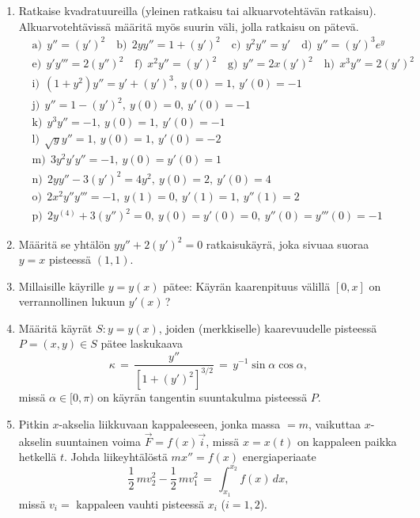 \Harj
\begin{enumerate}

\item
Ratkaise kvadratuureilla (yleinen ratkaisu tai alkuarvotehtävän ratkaisu). Alkuarvotehtävissä
määritä myös suurin väli, jolla ratkaisu on pätevä.
\begin{align*}
&\text{a)}\ \ y''=(y')^2 \quad
 \text{b)}\ \ 2yy''=1+(y')^2 \quad
 \text{c)}\ \ y^2y''=y' \quad
 \text{d)}\ \ y''=(y')^3e^y \\
&\text{e)}\ \ y'y'''=2(y'')^2 \quad
 \text{f)}\ \ x^2y''=(y')^2 \quad
 \text{g)}\ \ y''=2x(y')^2 \quad
 \text{h)}\ \ x^3y''=2(y')^2 \\
&\text{i)}\ \ (1+y^2)y''=y'+(y')^3,\ y(0)=1,\ y'(0)=-1 \\
&\text{j)}\ \ y''=1-(y')^2,\ y(0)=0,\ y'(0)=-1 \\
&\text{k)}\ \ y^3y''=-1,\ y(0)=1,\ y'(0)=-1 \\
&\text{l)}\ \ \sqrt{y}y''=1,\ y(0)=1,\ y'(0)=-2 \\
&\text{m)}\ \ 3y^2y'y''=-1,\ y(0)=y'(0)=1 \\
&\text{n)}\ \ 2yy''-3(y')^2=4y^2,\ y(0)=2,\ y'(0)=4 \\
&\text{o)}\ \ 2x^2y''y'''=-1,\ y(1)=0,\ y'(1)=1,\ y''(1)=2 \\
&\text{p)}\ \ 2y^{(4)}+3(y'')^2=0,\ y(0)=y'(0)=0,\ y''(0)=y'''(0)=-1
\end{align*}

\item
Määritä se yhtälön $yy''+2(y')^2=0$ ratkaisukäyrä, joka sivuaa suoraa $y=x$ pisteessä $(1,1)$.

\item
Millaisille käyrille $y=y(x)$ pätee: Käyrän kaarenpituus välillä $[0,x]$ on verrannollinen
lukuun $y'(x)\,$?

\item
Määritä käyrät $S: y=y(x)$, joiden (merkkiselle) kaarevuudelle pisteessä $P=(x,y) \in S$ pätee
laskukaava
\[
\kappa \,=\, \frac{y''}{[1+(y')^2]^{3/2}} \,=\, y^{-1}\sin\alpha\cos\alpha,
\]
missä $\alpha\in[0,\pi)$ on käyrän tangentin suuntakulma pisteessä $P$.

\item
Pitkin $x$-akselia liikkuvaan kappaleeseen, jonka massa $=m$, vaikuttaa $x$-akselin suuntainen 
voima $\vec F=f(x)\vec i$, missä $x=x(t)$ on kappaleen paikka hetkellä $t$. Johda 
liikeyhtälöstä $mx''=f(x)$ energiaperiaate
\[
\frac{1}{2}\,mv_2^2-\frac{1}{2}\,mv_1^2\,=\,\int_{x_1}^{x_2} f(x)\,dx,
\]
missä $v_i=$ kappaleen vauhti pisteessä $x_i$ ($i=1,2$).  


\end{enumerate}
